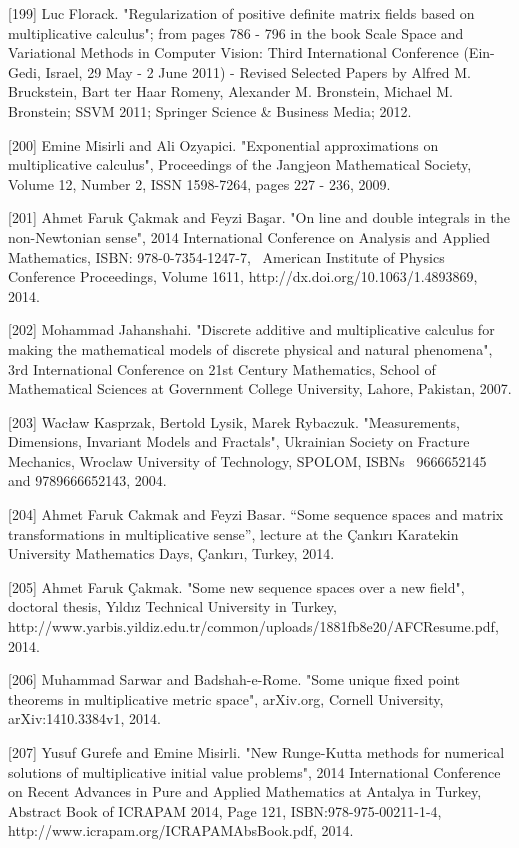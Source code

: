 \documentclass[12pt]{article}
\begin{document}
[199] Luc Florack. "Regularization of positive definite matrix fields based on multiplicative calculus"; from pages 786 - 796 in the book Scale Space and Variational Methods in Computer Vision: Third International Conference (Ein-Gedi, Israel, 29 May - 2 June 2011) - Revised Selected Papers by Alfred M. Bruckstein, Bart ter Haar Romeny, Alexander M. Bronstein, Michael M. Bronstein; SSVM 2011; Springer Science & Business Media; 2012.

[200] Emine Misirli and Ali Ozyapici. "Exponential approximations on multiplicative calculus", Proceedings of the Jangjeon Mathematical Society, Volume 12, Number 2, ISSN 1598-7264, pages 227 - 236, 2009.

[201] Ahmet Faruk Çakmak and Feyzi Başar. "On line and double integrals in the non-Newtonian sense", 2014 International Conference on Analysis and Applied Mathematics, ISBN: 978-0-7354-1247-7,  American Institute of Physics Conference Proceedings, Volume 1611, http://dx.doi.org/10.1063/1.4893869, 2014.

[202] Mohammad Jahanshahi. "Discrete additive and multiplicative calculus for making the mathematical models of discrete physical and natural phenomena", 3rd International Conference on 21st Century Mathematics, School of Mathematical Sciences at Government College University, Lahore, Pakistan, 2007.

[203] Wacław Kasprzak, Bertold Lysik, Marek Rybaczuk. "Measurements, Dimensions, Invariant Models and Fractals", Ukrainian Society on Fracture Mechanics, Wroclaw University of Technology, SPOLOM, ISBNs  9666652145 and 9789666652143, 2004.

[204] Ahmet Faruk Cakmak and Feyzi Basar. “Some sequence spaces and matrix transformations in multiplicative sense”, lecture at the Çankırı Karatekin University Mathematics Days, Çankırı, Turkey, 2014.

[205] Ahmet Faruk Çakmak. "Some new sequence spaces over a new field", doctoral thesis, Yıldız Technical University in Turkey, http://www.yarbis.yildiz.edu.tr/common/uploads/1881fb8e20/AFCResume.pdf, 2014. 

[206] Muhammad Sarwar and Badshah-e-Rome. "Some unique fixed point theorems in multiplicative metric space", arXiv.org, Cornell University, arXiv:1410.3384v1, 2014.

[207] Yusuf Gurefe and Emine Misirli. "New Runge-Kutta methods for numerical solutions of multiplicative initial value problems", 2014 International Conference on Recent Advances in Pure and Applied Mathematics at Antalya in Turkey, Abstract Book of ICRAPAM 2014, Page 121, ISBN:978-975-00211-1-4, http://www.icrapam.org/ICRAPAMAbsBook.pdf, 2014.
\end{document}
